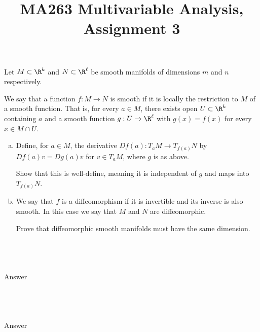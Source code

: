 \documentclass[a4paper]{article}
\title{MA263 Multivariable Analysis, Assignment 3}
\begin{document}
\maketitle

\setlength{\parindent}{0em}
\setlength{\parskip}{1em}


\begin{questionbody}
Let $M \subset \R^k$ and $N \subset \R^\ell$ be smooth manifolds of dimensions $m$ and $n$ respectively.

We say that a function $f : M \to N$ is smooth if it is locally the restriction to $M$ of a smooth function. That is, for every $a \in M$, there exists open $U \subset \R^k$ containing $a$ and a smooth function $g : U \to \R^\ell$ with $g(x) = f(x)$ for every $x \in M \cap U$.

\begin{enumerate}[(a)]
\item Define, for $a \in M$, the derivative $D f(a) : T_a M \to T_{f(a)} N$ by $D f(a) v = D g(a) v$ for $v \in T_a M$, where $g$ is as above.

Show that this is well-define, meaning it is independent of $g$ and maps into $T_{f(a)} N$.

\item We say that $f$ is a diffeomorphism if it is invertible and its inverse is also smooth. In this case we say that $M$ and $N$ are diffeomorphic.

Prove that diffeomorphic smooth manifolds must have the same dimension.
\end{enumerate}
\end{questionbody}

\subsection{~} %

Answer

\subsection{~} %

Answer


\end{document}
